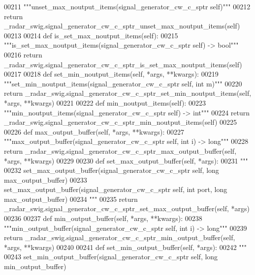 \begin{DoxyCode}
{{{00211         \textcolor{stringliteral}{"""unset\_max\_noutput\_items(signal\_generator\_cw\_c\_sptr self)"""}
00212         \textcolor{keywordflow}{return} \_radar\_swig.signal\_generator\_cw\_c\_sptr\_unset\_max\_noutput\_items(self)
00213 
00214     \textcolor{keyword}{def }is_set_max_noutput_items(self):
00215         \textcolor{stringliteral}{"""is\_set\_max\_noutput\_items(signal\_generator\_cw\_c\_sptr self) -> bool"""}
00216         \textcolor{keywordflow}{return} \_radar\_swig.signal\_generator\_cw\_c\_sptr\_is\_set\_max\_noutput\_items(self)
00217 
00218     \textcolor{keyword}{def }set_min_noutput_items(self, *args, **kwargs):
00219         \textcolor{stringliteral}{"""set\_min\_noutput\_items(signal\_generator\_cw\_c\_sptr self, int m)"""}
00220         \textcolor{keywordflow}{return} \_radar\_swig.signal\_generator\_cw\_c\_sptr\_set\_min\_noutput\_items(self, *args, **kwargs)
00221 
00222     \textcolor{keyword}{def }min_noutput_items(self):
00223         \textcolor{stringliteral}{"""min\_noutput\_items(signal\_generator\_cw\_c\_sptr self) -> int"""}
00224         \textcolor{keywordflow}{return} \_radar\_swig.signal\_generator\_cw\_c\_sptr\_min\_noutput\_items(self)
00225 
00226     \textcolor{keyword}{def }max_output_buffer(self, *args, **kwargs):
00227         \textcolor{stringliteral}{"""max\_output\_buffer(signal\_generator\_cw\_c\_sptr self, int i) -> long"""}
00228         \textcolor{keywordflow}{return} \_radar\_swig.signal\_generator\_cw\_c\_sptr\_max\_output\_buffer(self, *args, **kwargs)
00229 
00230     \textcolor{keyword}{def }set_max_output_buffer(self, *args):
00231         \textcolor{stringliteral}{"""}
00232 \textcolor{stringliteral}{        set\_max\_output\_buffer(signal\_generator\_cw\_c\_sptr self, long max\_output\_buffer)}
00233 \textcolor{stringliteral}{        set\_max\_output\_buffer(signal\_generator\_cw\_c\_sptr self, int port, long max\_output\_buffer)}
00234 \textcolor{stringliteral}{        """}
00235         \textcolor{keywordflow}{return} \_radar\_swig.signal\_generator\_cw\_c\_sptr\_set\_max\_output\_buffer(self, *args)
00236 
00237     \textcolor{keyword}{def }min_output_buffer(self, *args, **kwargs):
00238         \textcolor{stringliteral}{"""min\_output\_buffer(signal\_generator\_cw\_c\_sptr self, int i) -> long"""}
00239         \textcolor{keywordflow}{return} \_radar\_swig.signal\_generator\_cw\_c\_sptr\_min\_output\_buffer(self, *args, **kwargs)
00240 
00241     \textcolor{keyword}{def }set_min_output_buffer(self, *args):
00242         \textcolor{stringliteral}{"""}
00243 \textcolor{stringliteral}{        set\_min\_output\_buffer(signal\_generator\_cw\_c\_sptr self, long min\_output\_buffer)}
}}}
\end{DoxyCode}
